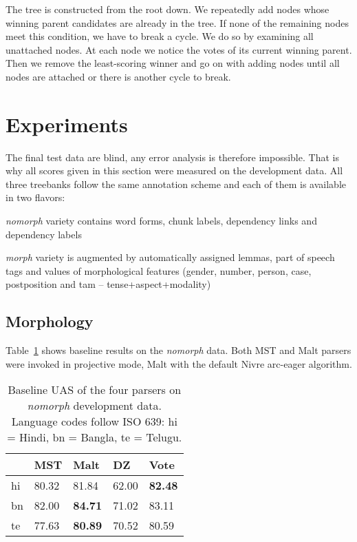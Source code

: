 \documentclass[11pt]{article}
\def\Tref#1{Table~\ref{#1}}
\begin{document}
The tree is constructed from the root down. We repeatedly add nodes whose winning parent candidates are already in the tree. If none of the remaining nodes meet this condition, we have to break a cycle. We do so by examining all unattached nodes. At each node we notice the votes of its current winning parent. Then we remove the least-scoring winner and go on with adding nodes until all nodes are attached or there is another cycle to break.

\section{Experiments}
\label{sec:experiments}

The final test data are blind, any error analysis is therefore impossible. That is why all scores given in this section were measured on the development data. All three treebanks follow the same annotation scheme and each of them is available in two flavors:

\begin{compactitem}
\item \textit{nomorph} variety contains word forms, chunk labels, dependency links and dependency labels
\item \textit{morph} variety is augmented by automatically assigned lemmas, part of speech tags and values of morphological features (gender, number, person, case, postposition and tam -- tense+aspect+modality)
\end{compactitem}

\subsection{Morphology}
\label{sec:morphology}

\Tref{tab:baseline} shows baseline results on the \textit{nomorph} data. Both MST and Malt parsers were invoked in projective mode, Malt with the default Nivre arc-eager algorithm.

\begin{table}[ht]
\begin{centering}
\begin{tabular}{l|l|l|l|l}
& \textbf{MST} & \textbf{Malt} & \textbf{DZ} & \textbf{Vote} \\
\hline
hi & 80.32 & 81.84 & 62.00 & \textbf{82.48}\\
bn & 82.00 & \textbf{84.71} & 71.02 & 83.11\\
te & 77.63 & \textbf{80.89} & 70.52 & 80.59\\
\end{tabular}
\caption{Baseline UAS of the four parsers on \textit{nomorph} development data. Language codes follow ISO 639: hi = Hindi, bn = Bangla, te = Telugu.}
\label{tab:baseline}
\end{centering}
\end{table}
\end{document}
